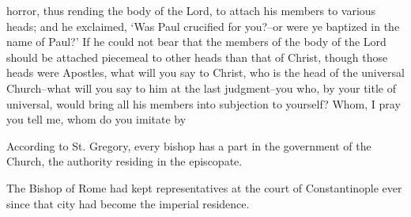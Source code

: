 horror, thus rending the body of the Lord, to attach his members to various heads; and he exclaimed, ‘Was Paul crucified for you?--or were ye baptized in the name of Paul?' If he could not bear that the members of the body of the Lord should be attached piecemeal to other heads than that of Christ, though those heads were Apostles, what will you say to Christ, who is the head of the universal Church--what will you say to him at the last judgment--you who, by your title of universal, would bring all his members into subjection to yourself? Whom, I pray you tell me, whom do you imitate by

According to St. Gregory, every bishop has a part in the government of the Church, the authority residing in the episcopate.

The Bishop of Rome had kept representatives at the court of Constantinople ever since that city had become the imperial residence.

